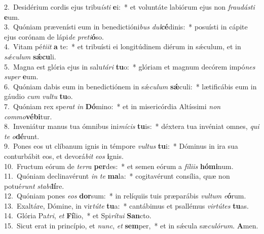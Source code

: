 {2.~}Desidérium cordis ejus tribu\textit{í}\textit{sti} \textbf{e}i:~* et voluntáte labiórum ejus non \textit{frau}\textit{dá}\textit{sti} \textbf{e}um.\\
{3.~}Quóniam prævenísti eum in benedictióni\textit{bus} \textit{dul}\textbf{cé}dinis:~* posuísti in cápite ejus corónam de lápi\textit{de} \textit{pre}\textit{ti}\textbf{ó}so.\\
{4.~}Vitam pé\textit{ti}\textit{it} \textbf{a} te:~* et tribuísti ei longitúdinem diérum in sǽculum, et in \textit{sǽ}\textit{cu}\textit{lum} \textbf{sǽ}\textbf{cu}li.\\
{5.~}Magna est glória ejus in salu\textit{tá}\textit{ri} \textbf{tu}o:~* glóriam et magnum decórem impó\textit{nes} \textit{su}\textit{per} \textbf{e}um.\\
{6.~}Quóniam dabis eum in benedictiónem in sǽ\textit{cu}\textit{lum} \textbf{sǽ}culi:~* lætificábis eum in gáudio \textit{cum} \textit{vul}\textit{tu} \textbf{tu}o.\\
{7.~}Quóniam rex spe\textit{rat} \textit{in} \textbf{Dó}mino:~* et in misericórdia Altíssimi \textit{non} \textit{com}\textit{mo}\textbf{vé}\textbf{bi}tur.\\
{8.~}Inveniátur manus tua ómnibus ini\textit{mí}\textit{cis} \textbf{tu}is:~* déxtera tua invéniat omnes, \textit{qui} \textit{te} \textit{o}\textbf{dé}runt.\\
{9.~}Pones eos ut clíbanum ignis in témpore \textit{vul}\textit{tus} \textbf{tu}i:~* Dóminus in ira sua conturbábit eos, et devorá\textit{bit} \textit{e}\textit{os} \textbf{i}gnis.\\
{10.~}Fructum eórum de \textit{ter}\textit{ra} \textbf{per}des:~* et semen eórum a \textit{fí}\textit{li}\textit{is} \textbf{hó}\textbf{mi}num.\\
{11.~}Quóniam declinavérunt \textit{in} \textit{te} \textbf{ma}la:~* cogitavérunt consília, quæ non potué\textit{runt} \textit{sta}\textit{bi}\textbf{lí}re.\\
{12.~}Quóniam pones \textit{e}\textit{os} \textbf{dor}sum:~* in relíquiis tuis præparábis \textit{vul}\textit{tum} \textit{e}\textbf{ó}rum.\\
{13.~}Exaltáre, Dómine, in vir\textit{tú}\textit{te} \textbf{tu}a:~* cantábimus et psallémus \textit{vir}\textit{tú}\textit{tes} \textbf{tu}as.\\
{14.~}Glória Pa\textit{tri}, \textit{et} \textbf{Fí}lio,~* et Spi\textit{rí}\textit{tu}\textit{i} \textbf{San}cto.\\
{15.~}Sicut erat in princípio, et \textit{nunc}, \textit{et} \textbf{sem}per,~* et in sǽcula sæ\textit{cu}\textit{ló}\textit{rum}. \textbf{A}men.\\
